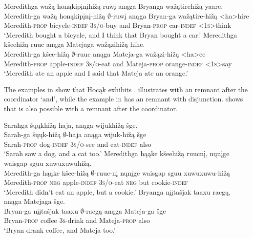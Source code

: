 \documentclass[output=paper]{LSP/langsci}
\begin{document}
 
\ea
\ea\label{ex:johnson:39a} 
\glll Meredithga {wažą honąkipįnįhižą} ruwį anąga Bryanga wažątirehižą yaare.\\
Meredith-ga {wažą honąkipįnį-hižą} $\emptyset$-ruwį anąga Bryan-ga wažątire-hižą <ha>hire\\
Meredith-\textsc{prop} bicycle-\textsc{indef} \textsc{3s/o}-buy and Bryan-\textsc{prop} car-\textsc{indef} \textsc{<1s>}think\\
\trans `Meredith bought a bicycle, and I think that Bryan bought a car.'
\ex\label{ex:johnson:39b}
\glll Meredithga kšeehižą ruuc anąga Matejaga wažązihižą hihe.\\
Meredith-ga kšee-hižą $\emptyset$-ruuc anąga Mateja-ga wažązi-hižą <ha>ee\\
Meredith-\textsc{prop} apple-\textsc{indef} \textsc{3s/o}-eat and Mateja-\textsc{prop} orange-\textsc{indef} <\textsc{1s}>say\\
\trans `Meredith ate an apple and I said that Mateja ate an orange.'
\z
\z

 
The examples in  show that Hocąk exhibits .  illustrates  with an  remnant after the coordinator `and', while the example in  has an  remnant with disjunction.  shows that  is also possible with a  remnant after the coordinator.
 

\ea\label{ex:johnson:40} 
\ea\label{ex:johnson:40a} 
\glll Sarahga šųųkhižą haja, anąga wijukhižą šge.\\
Sarah-ga šųųk-hižą $\emptyset$-haja anąga wijuk-hižą šge\\
Sarah-\textsc{prop} dog-\textsc{indef} \textsc{3s/o}-see and cat-\textsc{indef} also\\
\trans `Sarah saw a dog, and a cat too.'
 \ex\label{ex:johnson:40b}
\glll Meredithga hąąke kšeehižą ruucnį, nųnįge {waisgap sguu xuwuxuwuhižą}.\\
Meredith-ga hąąke kšee-hižą $\emptyset$-ruuc-nį nųnįge {waisgap sguu xuwuxuwu-hižą}\\
Meredith-\textsc{prop} \textsc{neg} apple-\textsc{indef} \textsc{3s/o}-eat \textsc{neg} but cookie-\textsc{indef}\\
\trans `Meredith didn't eat an apple, but a cookie.'
 \ex\label{ex:johnson:40c}
\glll Bryanga {nįįtašjak taaxu} racgą, anąga Matejaga šge.\\
Bryan-ga {nįįtašjak taaxu} $\emptyset$-racgą anąga Mateja-ga šge\\
Bryan-\textsc{prop} coffee \textsc{3s}-drink and Mateja-\textsc{prop} also\\
\trans `Bryan drank coffee, and Mateja too.'
\z
\z
\end{document}
